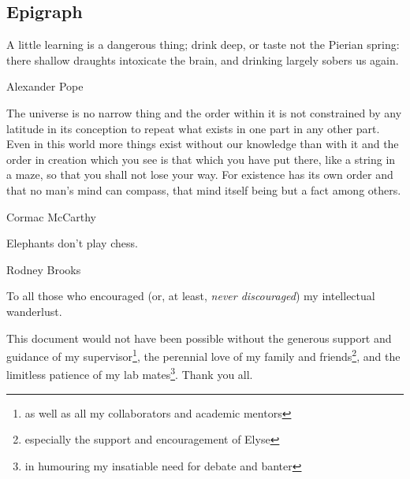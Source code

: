 \documentclass[oneandahalfspaced,twoside,12pt]{ut-thesis}
\begin{document}
\begin{preliminary}

\chapter*{Epigraph}
\epigraph{A little learning is a dangerous thing; 
drink deep, or taste not the Pierian spring: 
there shallow draughts intoxicate the brain, 
and drinking largely sobers us again.}{Alexander Pope}
\epigraph{The universe is no narrow thing and the order within it is not constrained by any latitude in its conception to repeat what exists in one part in any other part. Even in this world more things exist without our knowledge than with it and the order in creation which you see is that which you have put there, like a string in a maze, so that you shall not lose your way. For existence has its own order and that no man's mind can compass, that mind itself being but a fact among others.}{Cormac McCarthy}
\epigraph{Elephants don't play chess.}{Rodney Brooks}


\clearpage
	

\begin{dedication}
To all those who encouraged (or, at least, \textit{never discouraged}) my intellectual wanderlust.
\end{dedication}

\newpage  %


\begin{acknowledgements}
This document would not have been possible without the generous support and guidance of my supervisor\footnote{as well as all my collaborators and academic mentors}, the perennial love of my family and friends\footnote{especially the support and encouragement of Elyse}, and the limitless patience of my lab mates\footnote{in humouring my insatiable need for debate and banter}. Thank you all.
\end{acknowledgements}


\end{preliminary}
\end{document}

